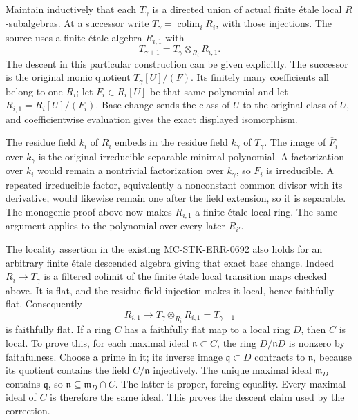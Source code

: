 Maintain inductively that each \(T_\gamma\) is a directed union of actual finite étale local \(R\)-subalgebras. At a successor write \(T_\gamma=\operatorname*{colim}_i R_i\), with those injections. The source uses a finite étale algebra \(R_{i,1}\) with \[
 T_{\gamma+1}=T_\gamma\otimes_{R_i}R_{i,1}.
\] The descent in this particular construction can be given explicitly. The successor is the original monic quotient \(T_\gamma[U]/(F)\). Its finitely many coefficients all belong to one \(R_i\); let \(F_i\in R_i[U]\) be that same polynomial and let \(R_{i,1}=R_i[U]/(F_i)\). Base change sends the class of \(U\) to the original class of \(U\), and coefficientwise evaluation gives the exact displayed isomorphism.

The residue field \(k_i\) of \(R_i\) embeds in the residue field \(k_\gamma\) of \(T_\gamma\). The image of \(\overline F_i\) over \(k_\gamma\) is the original irreducible separable minimal polynomial. A factorization over \(k_i\) would remain a nontrivial factorization over \(k_\gamma\), so \(\overline F_i\) is irreducible. A repeated irreducible factor, equivalently a nonconstant common divisor with its derivative, would likewise remain one after the field extension, so it is separable. The monogenic proof above now makes \(R_{i,1}\) a finite étale local ring. The same argument applies to the polynomial over every later \(R_{i'}\).

The locality assertion in the existing MC-STK-ERR-0692 also holds for an arbitrary finite étale descended algebra giving that exact base change. Indeed \(R_i\to T_\gamma\) is a filtered colimit of the finite étale local transition maps checked above. It is flat, and the residue-field injection makes it local, hence faithfully flat. Consequently \[
 R_{i,1}\longrightarrow T_\gamma\otimes_{R_i}R_{i,1}=T_{\gamma+1}
\] is faithfully flat. If a ring \(C\) has a faithfully flat map to a local ring \(D\), then \(C\) is local. To prove this, for each maximal ideal \(\mathfrak n\subset C\), the ring \(D/\mathfrak nD\) is nonzero by faithfulness. Choose a prime in it; its inverse image \(\mathfrak q\subset D\) contracts to \(\mathfrak n\), because its quotient contains the field \(C/\mathfrak n\) injectively. The unique maximal ideal \(\mathfrak m_D\) contains \(\mathfrak q\), so \(\mathfrak n\subseteq \mathfrak m_D\cap C\). The latter is proper, forcing equality. Every maximal ideal of \(C\) is therefore the same ideal. This proves the descent claim used by the correction.

